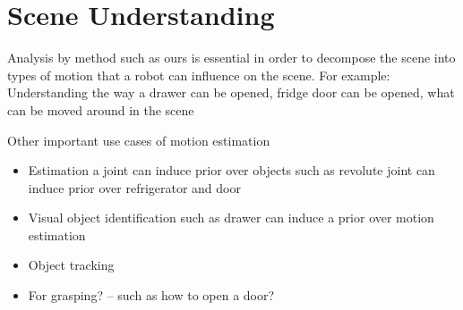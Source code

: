 \documentclass[conference]{IEEEtran}
\begin{document}
%
%
% 
%
%



\section{Scene Understanding}
Analysis by method such as ours is essential in order to decompose the scene into types of motion that a robot can influence on the scene.
For example: Understanding the way a drawer can be opened, fridge door can be opened, what can be moved around in the scene

Other important use cases of motion estimation
\begin{itemize}
\item Estimation a joint can induce prior over objects such as revolute joint can induce prior over refrigerator and door
\item Visual object identification such as drawer can induce a prior over motion estimation
\item Object tracking 
\item For grasping? -- such as how to open a door?
\end{itemize}
\end{document}

